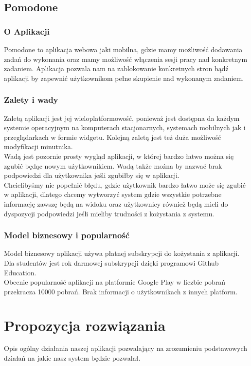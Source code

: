\documentclass[a4paper,11pt]{report}
\begin{document}
\subsection{Pomodone}
\subsubsection{O Aplikacji}
Pomodone to aplikacja webowa jaki mobilna, gdzie mamy możliwość dodawania zadań do wykonania oraz mamy możliwość włączenia sesji pracy nad konkretnym zadaniem. Aplikacja pozwala nam na zablokowanie konkretnych stron bądź aplikacji by zapewnić użytkownikom pełne skupienie nad wykonanym zadaniem.
\subsubsection{Zalety i wady}
Zaletą aplikacji jest jej wieloplatformowość, ponieważ jest dostępna da każdym systemie operacyjnym na komputerach stacjonarnych, systemach mobilnych jak i przeglądarkach w formie widgetu. Kolejną zaletą jest też duża możliwość modyfikacji minutnika.\vspace{0,5cm}\\ Wadą jest pozornie prosty wygląd aplikacji, w której bardzo łatwo można się zgubić będąc nowym użytkownikiem. Wadą także można by nazwać brak podpowiedzi dla użytkownika jeśli zgubiłby się w aplikacji.
\vspace{0,5cm}\\Chcielibyśmy nie popełnić błędu, gdzie użytkownik bardzo łatwo może się zgubić w aplikacji, dlatego chcemy wytworzyć system gdzie wszystkie potrzebne informację zawszę będą na widoku oraz użytkownicy również będą mieli do dyspozycji podpowiedzi jeśli mieliby trudności z kożystania z systemu.
\subsubsection{Model biznesowy i popularność}
Model biznesowy aplikacji używa płatnej subskrypcji do kożystania z aplikacji. Dla studentów jest rok darmowej subskrypcji dzięki programowi Github Education.\vspace{0,5cm}\\
Obecnie popularność aplikacji na platformie Google Play w liczbie pobrań przekracza 10000 pobrań. Brak informacji o użytkownikach z innych platform.
\section {Propozycja rozwiązania}
Opis ogólny działania naszej aplikacji pozwalający na zrozumieniu podstawowych działań na jakie nasz system będzie pozwalał.
\end{document}
